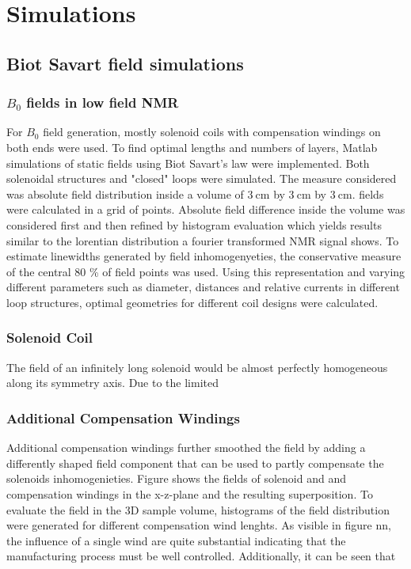 \chapter{Simulations}\label{chapter:simulations}
\section{Biot Savart field simulations}
\subsection{$B_0$ fields in low field NMR}\label{simulations:B0}
		For $B_0$ field generation, mostly solenoid coils with compensation windings on both ends
		were used. To find optimal lengths and numbers of layers, Matlab simulations of static fields using Biot Savart's law were implemented.
		Both solenoidal structures and "closed" loops were simulated.
		The measure considered was absolute field distribution inside a volume of
		$\SI{3}{\centi\meter}$ by  $\SI{3}{\centi\meter}$ by $\SI{3}{\centi\meter}$. 
		fields were calculated in a grid of  points. Absolute field difference inside the volume was considered first and then refined by
		histogram evaluation which yields results similar to the lorentian distribution a fourier transformed NMR signal shows. To estimate linewidths generated by field inhomogenyeties, the conservative measure of the central 80 \% of field points was used.
		Using this representation and varying different parameters such as diameter, distances and relative currents in different loop structures, optimal geometries for different coil designs were calculated.
		\subsection{Solenoid Coil}
			The field of an infinitely long solenoid would be almost perfectly homogeneous along its symmetry axis. Due to the limited
		\subsection{Additional Compensation Windings}
			Additional compensation windings further smoothed the field by adding a differently shaped field component that can be used to partly compensate the solenoids inhomogenieties. Figure  shows the fields of solenoid and and compensation windings in the x-z-plane and the resulting superposition.
			To evaluate the field in the 3D sample volume, histograms of the field distribution were generated for different compensation wind lenghts. As visible in figure nn, the influence of a single wind are quite substantial indicating that the manufacturing process must be well controlled. Additionally, it can be seen that

